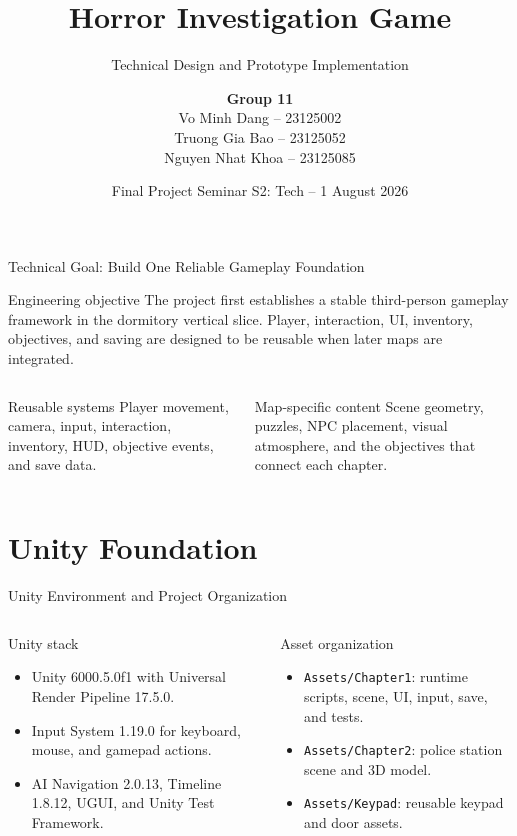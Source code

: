 \documentclass[aspectratio=169,10pt]{beamer}
\title{Horror Investigation Game}
\subtitle{Technical Design and Prototype Implementation}
\author{\textbf{Group 11}\\[0.2cm]\small
Vo Minh Dang -- 23125002\\
Truong Gia Bao -- 23125052\\
Nguyen Nhat Khoa -- 23125085}
\institute{Advanced Program (APCS) \\ 3D Visualization and Game Development -- 23TT}
\date{Final Project Seminar S2: Tech -- 1 August 2026}
\begin{document}
\begin{frame}
  \titlepage
\end{frame}

\begin{frame}{Technical Goal: Build One Reliable Gameplay Foundation}
  \begin{block}{Engineering objective}
    The project first establishes a stable third-person gameplay framework in the dormitory vertical slice. Player, interaction, UI, inventory, objectives, and saving are designed to be reusable when later maps are integrated.
  \end{block}

  \vspace{0.35cm}
  \begin{columns}[T,onlytextwidth]
    \begin{block}{Reusable systems}
      Player movement, camera, input, interaction, inventory, HUD, objective events, and save data.
    \end{block}
    \begin{block}{Map-specific content}
      Scene geometry, puzzles, NPC placement, visual atmosphere, and the objectives that connect each chapter.
    \end{block}
  \end{columns}
\end{frame}

\section{Unity Foundation}
\begin{frame}{Unity Environment and Project Organization}
  \begin{columns}[T,onlytextwidth]
    \begin{block}{Unity stack}
      \begin{itemize}
        \item Unity 6000.5.0f1 with Universal Render Pipeline 17.5.0.
        \item Input System 1.19.0 for keyboard, mouse, and gamepad actions.
        \item AI Navigation 2.0.13, Timeline 1.8.12, UGUI, and Unity Test Framework.
      \end{itemize}
    \end{block}
    \begin{block}{Asset organization}
      \begin{itemize}
        \item \texttt{Assets/Chapter1}: runtime scripts, scene, UI, input, save, and tests.
        \item \texttt{Assets/Chapter2}: police station scene and 3D model.
        \item \texttt{Assets/Keypad}: reusable keypad and door assets.
      \end{itemize}
    \end{block}
  \end{columns}
\end{frame}
\end{document}
